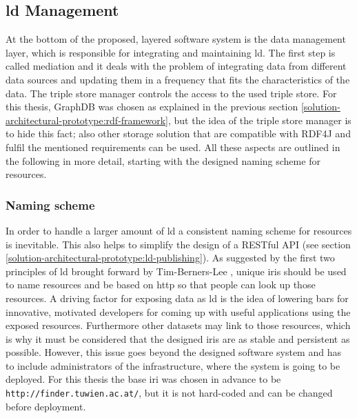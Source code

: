 \documentclass[draft,final]{vutinfth} %
\begin{document}
\subsection{\gls{ld} Management}
\label{solution-architectural-prototype:ld-management}
At the bottom of the proposed, layered software system is the data management layer, which is responsible for integrating and maintaining \gls{ld}. The first step is called mediation and it deals with the problem of integrating data from different data sources and updating them in a frequency that fits the characteristics of the data. The triple store manager controls the access to the used triple store. For this thesis, GraphDB was chosen as explained in the previous section \ref{solution-architectural-prototype:rdf-framework}, but the idea of the triple store manager is to hide this fact; also other storage solution that are compatible with RDF4J and fulfil the mentioned requirements can be used. All these aspects are outlined in the following in more detail, starting with the designed naming scheme for resources.


\subsubsection{Naming scheme}
In order to handle a larger amount of \gls{ld} a consistent naming scheme for resources is inevitable. This also helps to simplify the design of a RESTful API (see section \ref{solution-architectural-prototype:ld-publishing}). As suggested by the first two principles of \gls{ld} brought forward by Tim-Berners-Lee \cite{berners-lee_linked_2009}, unique \gls{iri}s should be used to name resources and be based on \gls{http} so that people can look up those resources. A driving factor for exposing data as \gls{ld} is the idea of lowering bars for innovative, motivated developers for coming up with useful applications using the exposed resources. Furthermore other datasets may link to those resources, which is why it must be considered that the designed \gls{iri}s are as stable and persistent as possible. However, this issue goes beyond the designed software system and has to include administrators of the infrastructure, where the system is going to be deployed. For this thesis the base \gls{iri} was chosen in advance to be \texttt{http://finder.tuwien.ac.at/}, but it is not hard-coded and can be changed before deployment.
\end{document}

